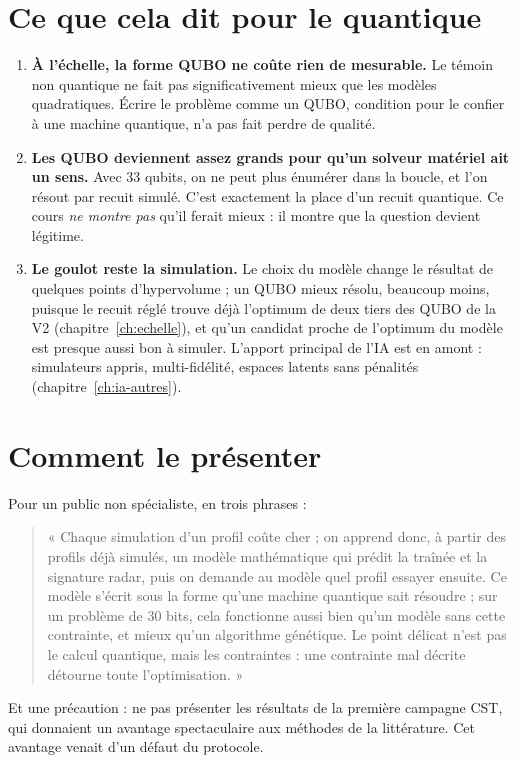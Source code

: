 \section{Ce que cela dit pour le quantique}
\begin{enumerate}
\item \textbf{À l'échelle, la forme QUBO ne coûte rien de mesurable.} Le témoin non quantique ne fait pas significativement mieux que les modèles quadratiques. Écrire le problème comme un QUBO, condition pour le confier à une machine quantique, n'a pas fait perdre de qualité.
\item \textbf{Les QUBO deviennent assez grands pour qu'un solveur matériel ait un sens.} Avec 33 qubits, on ne peut plus énumérer dans la boucle, et l'on résout par recuit simulé. C'est exactement la place d'un recuit quantique. Ce cours \emph{ne montre pas} qu'il ferait mieux : il montre que la question devient légitime.
\item \textbf{Le goulot reste la simulation.} Le choix du modèle change le résultat de quelques points d'hypervolume ; un QUBO mieux résolu, beaucoup moins, puisque le recuit réglé trouve déjà l'optimum de deux tiers des QUBO de la V2 (chapitre~\ref{ch:echelle}), et qu'un candidat proche de l'optimum du modèle est presque aussi bon à simuler. L'apport principal de l'IA est en amont : simulateurs appris, multi-fidélité, espaces latents sans pénalités (chapitre~\ref{ch:ia-autres}).
\end{enumerate}

\section{Comment le présenter}
Pour un public non spécialiste, en trois phrases :
\begin{quote}
« Chaque simulation d'un profil coûte cher ; on apprend donc, à partir des profils déjà simulés, un modèle mathématique qui prédit la traînée et la signature radar, puis on demande au modèle quel profil essayer ensuite. Ce modèle s'écrit sous la forme qu'une machine quantique sait résoudre ; sur un problème de 30 bits, cela fonctionne aussi bien qu'un modèle sans cette contrainte, et mieux qu'un algorithme génétique. Le point délicat n'est pas le calcul quantique, mais les contraintes : une contrainte mal décrite détourne toute l'optimisation. »
\end{quote}
Et une précaution : ne pas présenter les résultats de la première campagne CST, qui donnaient un avantage spectaculaire aux méthodes de la littérature. Cet avantage venait d'un défaut du protocole.

